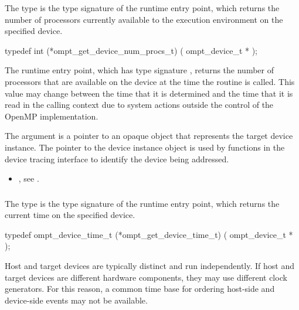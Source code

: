 \summary
The  type is the type signature of the 
 runtime entry point, which returns the 
number of processors currently available to the execution environment on 
the specified device.

\format
\begin{ccppspecific}
\begin{omptInquiry}
typedef int (*ompt_get_device_num_procs_t) (
  ompt_device_t *
);
\end{omptInquiry}
\end{ccppspecific}

\descr
The  runtime entry point, which has type 
signature , returns the number of processors 
that are available on the device at the time the routine is called. This value 
may change between the time that it is determined and the time that it is read 
in the calling context due to system actions outside the control of the OpenMP 
implementation.

\argdesc
The  argument is a pointer to an opaque object that
represents the target device instance. The pointer to the device
instance object is used by functions in the device tracing interface
to identify the device being addressed.

\crossreferences
\begin{itemize}
\item {}, see .
\end{itemize}



\subsubsection{}
\label{sec:ompt_get_device_time_t}

\summary
The  type is the type signature of the 
 runtime entry point, which returns the 
current time on the specified device.

\format
\begin{ccppspecific}
\begin{omptInquiry}
typedef ompt_device_time_t (*ompt_get_device_time_t) (
  ompt_device_t *
);
\end{omptInquiry}
\end{ccppspecific}

\descr
Host and target devices are typically distinct and run independently.
If host and target devices are different hardware components, they
may use different clock generators. For this reason, a common time 
base for ordering host-side and device-side events may not be available.

